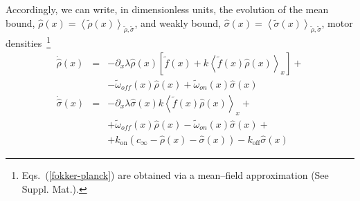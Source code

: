 \documentclass[prl,aps,twocolumn, floatfix, superscriptaddress,showpacs]{revtex4}
\begin{document}
Accordingly, we can write, in dimensionless units, the evolution of the mean bound, 
$\hat\rho(x)=\left\langle {\tilde\rho}(x)\right\rangle_{\tilde\rho,\tilde\sigma}$, and weakly bound, $\hat\sigma(x)=\left\langle {\tilde\sigma}(x)\right\rangle_{\tilde\rho,\tilde\sigma}$, motor densities~\footnote{Eqs.~(\ref{fokker-planck}) are obtained via a mean--field approximation (See Suppl. Mat.).
}
\begin{eqnarray}\label{fokker-planck}
\dot{\hat\rho}(x) &=&-\partial_{x}\lambda \hat\rho(x)\left[\tilde{f}(x)+k\left\langle \tilde{f}(x) \hat\rho(x)\right\rangle _{x}\right]+\nonumber\\
&&-\tilde\omega_{off}(x)\hat\rho(x)+\tilde\omega_{on}(x)\hat\sigma(x)\nonumber\\
\dot{\hat\sigma}(x) &=&-\partial_{x}\lambda\hat\sigma(x)k\left\langle \tilde{f}(x) \hat\rho(x)\right\rangle_{x}+\\ &&+\tilde\omega_{off}(x) \hat\rho(x)-\tilde\omega_{on}(x) \hat\sigma(x)+\nonumber\\
&&+k_{\mbox{on}}\left( c_{\infty}-\hat{\rho}(x)-\hat{\sigma}(x)\right)-k_{\mbox{off}} \hat{\sigma}(x)\nonumber
\end{eqnarray}
\end{document}
